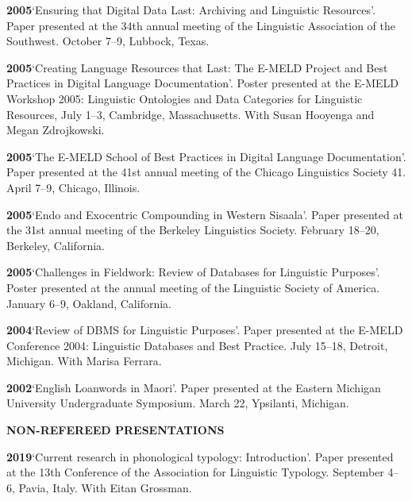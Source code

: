 \documentclass[11pt]{article}
\newcommand{\hangpara}{
 \setlength{\parindent}{0in} %
 \hangindent=0.42in %
}
\begin{document}
\vskip 6pt
\hangpara
{\bf 2005}\hspace{1ex}`Ensuring that Digital Data Last: Archiving and Linguistic Resources'. Paper presented at the 34th annual meeting of the Linguistic Association of the Southwest. October 7--9, Lubbock, Texas. 
 
\vskip 6pt
\hangpara
{\bf 2005}\hspace{1ex}`Creating Language Resources that Last: The E-MELD Project and Best Practices in Digital Language Documentation'. Poster presented at the E-MELD Workshop 2005: Linguistic Ontologies and Data Categories for Linguistic Resources, July 1--3, Cambridge, Massachusetts. With Susan Hooyenga and Megan Zdrojkowski.

\vskip 6pt
\hangpara
{\bf 2005}\hspace{1ex}`The E-MELD School of Best Practices in Digital Language Documentation'. Paper presented at the 41st annual meeting of the Chicago Linguistics Society 41. April 7--9, Chicago, Illinois.

\vskip 6pt
\hangpara
{\bf 2005}\hspace{1ex}`Endo and Exocentric Compounding in Western Sisaala'. Paper presented at the 31st annual meeting of the Berkeley Linguistics Society. February 18--20, Berkeley, California.

\vskip 6pt
\hangpara
{\bf 2005}\hspace{1ex}`Challenges in Fieldwork: Review of Databases for Linguistic Purposes'. Poster presented at the annual meeting of the Linguistic Society of America. January 6--9, Oakland, California.

\vskip 6pt
\hangpara
{\bf 2004}\hspace{1ex}`Review of DBMS for Linguistic Purposes'. Paper presented at the E-MELD Conference 2004: Linguistic Databases and Best Practice. July 15--18, Detroit, Michigan. With Marisa Ferrara.

\vskip 6pt
\hangpara
{\bf 2002}\hspace{1ex}`English Loanwords in Maori'. Paper presented at the Eastern Michigan University Undergraduate Symposium. March 22, Ypsilanti, Michigan.


\vskip 20pt
\begin{flushleft}
{\bf NON-REFEREED PRESENTATIONS}
\end{flushleft}

\hangpara
{\bf 2019}\hspace{1ex}`Current research in phonological typology: Introduction'. Paper presented at the 13th Conference of the Association for Linguistic Typology. September 4--6, Pavia, Italy. With Eitan Grossman.
\end{document}
